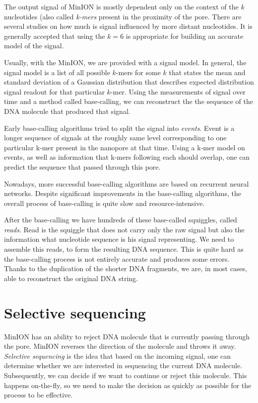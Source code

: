 The output signal of MinION is mostly dependent only on the context of the $k$
nucleotides (also called \textit{k-mers} present in the proximity of the pore. There are several studies on
how much is signal influenced by more distant nucleotides. It is generally accepted
that using the $k = 6$ is appropriate for building an accurate model of the signal. 

Usually, with the MinION, we are provided with a signal model.
In general, the signal model is a list of all possible $k$-mers for some $k$
that states the mean and standard deviation of a Gaussian distribution that
describes expected distribution signal readout for that particular $k$-mer.
Using the measurements of signal over time and a method called base-calling, we can reconstruct the
the sequence of the DNA molecule that produced that signal.

Early base-calling algorithms tried to split the signal into \textit{events}\cite{david2017nanocall}.
Event is a longer sequence of signals at the roughly same level corresponding
to one particular k-mer present in the nanopore at that time. Using a k-mer model on events, as well as information
that k-mers following each should overlap, one can predict the sequence that passed through this pore.

Nowadays, more successful base-calling algorithms are based on recurrent neural
networks. Despite significant improvements in the base-calling algorithms, the overall
process of base-calling is quite slow and resource-intensive.

After the base-calling we have hundreds of these base-called squiggles, called \textit{reads}.
Read is the squiggle that does not carry only the raw signal but also the information
what nucleotide sequence is his signal representing. We need to assemble this reads,
to form the resulting DNA sequence. This is quite hard as the base-calling process is not entirely
accurate and produces some errors. Thanks to the duplication of the shorter DNA
fragments, we are, in most cases, able to reconstruct the original DNA string.

\section{Selective sequencing}

MinION has an ability to reject DNA molecule that is currently passing through
the pore. MinION reverses the direction of the molecule and throws it away.
\textit{Selective sequencing} is the idea that based on the incoming signal, one can determine
whether we are interested in sequencing the current DNA molecule. Subsequently, we can decide if we want
to continue or reject this molecule. This happens on-the-fly, so we need to make
the decision as quickly as possible for the process to be effective.

